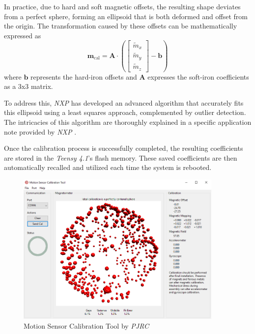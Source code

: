 In practice, due to hard and soft magnetic offsets, the resulting shape deviates from a perfect sphere,
forming an ellipsoid that is both deformed and offset from the origin.
The transformation caused by these offsets can be mathematically expressed as
\begin{equation}
	\mathbf{m}_\text{cal} = \mathbf{A} \cdot \left( \begin{bmatrix} \tilde{m}_x \\ \tilde{m}_y \\ \tilde{m}_z \end{bmatrix} - \mathbf{b} \right)
\end{equation}
where $\mathbf{b}$ represents the hard-iron offsets and $\mathbf{A}$ expresses the soft-iron coefficients as a 3x3 matrix.

To address this, \textit{NXP} has developed an advanced algorithm that accurately fits this ellipsoid using a least squares approach, complemented by outlier detection.
The intricacies of this algorithm are thoroughly explained in a specific application note provided by \textit{NXP} \cite{compass_calibration}.

Once the calibration process is successfully completed, the resulting coefficients are stored in the \textit{Teensy 4.1}'s flash memory.
These saved coefficients are then automatically recalled and utilized each time the system is rebooted.
\begin{figure}[h!]
	\centering
	\includegraphics[width=0.9\textwidth]{images/6_design_final/sensor_calibration.png}
	\caption{Motion Sensor Calibration Tool by \textit{PJRC}}
	\label{fig:sensor_calibration_tool}
\end{figure}


